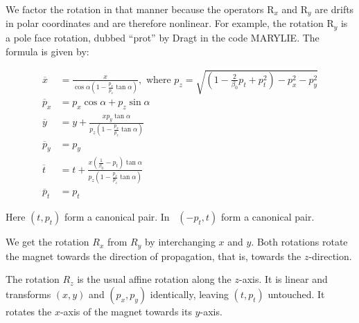 We factor the rotation in that manner because the operators R$_{x}$
and R$_{y}$ are drifts in polar coordinates and are therefore nonlinear.
For example, the rotation R$_{y}$ is a pole face rotation, dubbed
``prot'' by Dragt in the code MARYLIE. The formula is given by:

\begin{align}
  \overline{x} &=
    \frac{x}{\cos\alpha\left(1-\frac{p_x}{p_z}\tan\alpha\right)},
    \text{ where }
    p_z = \sqrt{\left(1-\frac{2}{\beta_0}p_t + p_t^2\right)
                - p_x^2 - p_y^2}  \nonumber \\
  \overline{p}_x &= p_x\cos\alpha + p_z\sin\alpha   \nonumber \\
  \overline{y} &= y
    + \frac{x p_y\tan\alpha}%
           {p_z\left(1-\frac{p_x}{p_z}\tan\alpha\right)}  \nonumber    \\
  \overline{p}_y &= p_y  \label{eq:prot}  \\
  \overline{t} &=  t
    + \frac{x\left(\frac{1}{\beta_0}-p_t\right)\tan\alpha}%
           {p_z\left(1-\frac{p_x}{p_z}\tan\alpha\right)}  \nonumber \\
  \overline{p}_t &= p_t  \nonumber
\end{align}

Here $(t,p_t)$ form a canonical pair.  In \PTC\ $(-p_t,t)$ form a canonical pair.

We get the rotation $R_x$ from $R_y$ by interchanging $x$ and $y$. Both
rotations rotate the magnet towards the direction of propagation, that is,
towards the $z$-direction.

The rotation $R_z$ is the usual affine rotation along the $z$-axis.
It is linear and transforms $(x,y)$ and $(p_x,p_y)$ identically,
leaving $(t,p_t)$ untouched.  It rotates the $x$-axis of the magnet
towards its $y$-axis.


